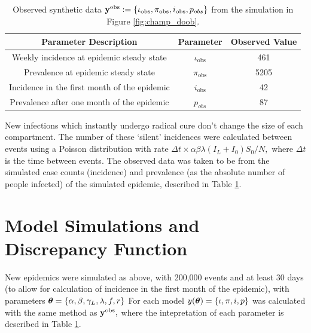 \begin{table}[htbp]
    \caption{
        Observed synthetic data
        $\mathbf{y}^{\mathrm{obs}} := \{\iota_\text{obs}, \pi_\text{obs}, i_\text{obs}, p_{obs}\}$
        from the simulation in Figure \ref{fig:champ_doob}.
    }
    \label{tab:obs_data}
    \centering
    \begin{tabular}{c|c|c}
        Parameter Description                        & Parameter
                                                     & Observed Value     \\
        \hline
        Weekly incidence at epidemic steady state    & $\iota_\text{obs}$
                                                     & 461                \\
        Prevalence at epidemic steady state          & $\pi_\text{obs}$
                                                     & 5205               \\
        Incidence in the first month of the epidemic & $i_\text{obs}$
                                                     & 42                 \\
        Prevalence after one month of the epidemic   & $p_{obs}$
                                                     & 87                 \\
    \end{tabular}
\end{table}


New infections which instantly undergo radical cure don't change the size of
each compartment. The number of these `silent' incidences were calculated
between events using a Poisson distribution with rate
$\Delta t \times \alpha \beta \lambda (I_L + I_0) S_0 / N,$ where $\Delta t$ is
the time between events.
The observed data was taken to
be from the simulated case counts (incidence) and prevalence
(as the absolute number of people infected) of the
simulated epidemic, described in Table \ref{tab:obs_data}.

\section{Model Simulations and Discrepancy Function}

New epidemics were simulated as above, with 200,000 events and at least 30
days (to allow for calculation of incidence in the first month of the
epidemic), with parameters
$\bm{\theta} = \{\alpha, \beta, \gamma_L, \lambda, f, r\}$
For each model
$y(\bm{\theta}) = \{\iota, \pi, i, p\}$ was
calculated with the same method as $\mathbf{y}^{\mathrm{obs}},$ where the intepretation of each
parameter is described in Table \ref{tab:obs_data}.

